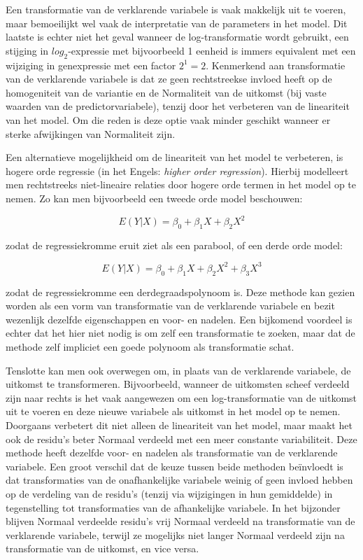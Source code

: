 \documentclass[
  12pt,dutch]{book}
\theoremstyle{definition}
\theoremstyle{definition}
\theoremstyle{definition}
\theoremstyle{definition}
\theoremstyle{remark}
\begin{document}
Een transformatie van de verklarende variabele is vaak makkelijk uit te voeren, maar bemoeilijkt wel vaak de interpretatie van de parameters in het model. Dit laatste is echter niet het geval wanneer de log-transformatie wordt gebruikt, een stijging in \(log_2\)-expressie met bijvoorbeeld 1 eenheid is immers equivalent met een wijziging in genexpressie met een factor \(2^1=2\). Kenmerkend aan transformatie van de verklarende variabele is dat ze geen rechtstreekse invloed heeft op de homogeniteit van de variantie en de Normaliteit van de uitkomst (bij vaste waarden van de predictorvariabele), tenzij door het verbeteren van de lineariteit van het model. Om die reden is deze optie vaak minder geschikt wanneer er sterke afwijkingen van Normaliteit zijn.

Een alternatieve mogelijkheid om de lineariteit van het model te verbeteren, is hogere orde regressie (in het Engels:
\emph{higher order regression}). Hierbij modelleert men rechtstreeks niet-lineaire relaties door hogere orde termen in het model op te nemen. Zo kan men bijvoorbeeld een tweede orde model beschouwen:

\[E(Y|X)=\beta_0+\beta_1X+\beta_2X^2\]

zodat de regressiekromme eruit ziet als een parabool, of een derde
orde model:

\[E(Y|X)=\beta_0+\beta_1X+\beta_2X^2+\beta_3X^3\]

zodat de regressiekromme een derdegraadspolynoom is. Deze methode kan gezien worden als een vorm van transformatie van de verklarende
variabele en bezit wezenlijk dezelfde eigenschappen en voor- en nadelen. Een bijkomend voordeel is echter dat het hier niet nodig is om zelf een transformatie te zoeken, maar dat de methode zelf impliciet een goede
polynoom als transformatie schat.

Tenslotte kan men ook overwegen om, in plaats van de verklarende variabele, de uitkomst te transformeren. Bijvoorbeeld, wanneer de uitkomsten scheef verdeeld zijn naar rechts is het vaak aangewezen om een log-transformatie van de uitkomst uit te voeren en deze nieuwe variabele als uitkomst in het model op te nemen. Doorgaans verbetert dit niet alleen de lineariteit van het model, maar maakt het ook de residu's beter Normaal verdeeld met een meer constante variabiliteit. Deze methode heeft dezelfde voor- en nadelen als transformatie van de verklarende variabele. Een groot verschil dat de keuze tussen beide methoden beïnvloedt is dat transformaties van de onafhankelijke variabele weinig of geen invloed hebben op de verdeling van de residu's (tenzij via wijzigingen in hun gemiddelde)
in tegenstelling tot transformaties van de afhankelijke variabele. In het bijzonder blijven Normaal verdeelde residu's vrij Normaal verdeeld na transformatie van de verklarende variabele, terwijl ze mogelijks niet langer Normaal verdeeld zijn na transformatie van de uitkomst, en vice versa.
\end{document}
